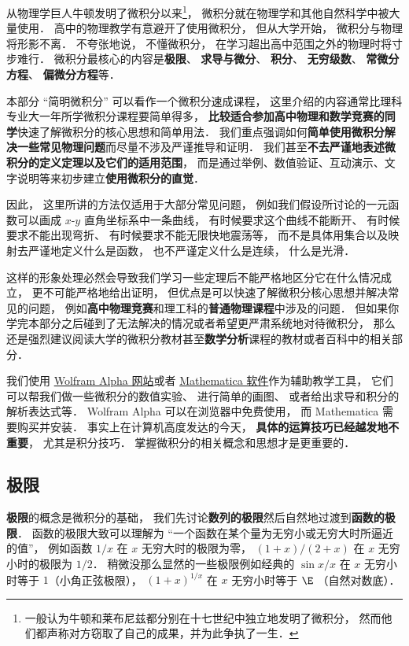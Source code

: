 
\begin{issues}
\issueDraft
\end{issues}

从物理学巨人牛顿发明了微积分以来\footnote{一般认为牛顿和莱布尼兹都分别在十七世纪中独立地发明了微积分， 然而他们都声称对方窃取了自己的成果，并为此争执了一生．}， 微积分就在物理学和其他自然科学中被大量使用． 高中的物理教学有意避开了使用微积分， 但从大学开始， 微积分与物理将形影不离． 不夸张地说， 不懂微积分， 在学习超出高中范围之外的物理时将寸步难行． 微积分最核心的内容是\textbf{极限}、 \textbf{求导与微分}、 \textbf{积分}、 \textbf{无穷级数}、 \textbf{常微分方程}、 \textbf{偏微分方程}等．

本部分 “简明微积分” 可以看作一个微积分速成课程， 这里介绍的内容通常比理科专业大一年所学微积分课程要简单得多， \textbf{比较适合参加高中物理和数学竞赛的同学}快速了解微积分的核心思想和简单用法． 我们重点强调如何\textbf{简单使用微积分解决一些常见物理问题}而尽量不涉及严谨推导和证明． 我们甚至\textbf{不去严谨地表述微积分的定义定理以及它们的适用范围}， 而是通过举例、数值验证、互动演示、文字说明等来初步建立\textbf{使用微积分的直觉}．

因此， 这里所讲的方法仅适用于大部分常见问题， 例如我们假设所讨论的一元函数可以画成 $x$-$y$ 直角坐标系中一条曲线， 有时候要求这个曲线不能断开、 有时候要求不能出现弯折、 有时候要求不能无限快地震荡等， 而不是具体用集合以及映射去严谨地定义什么是函数， 也不严谨定义什么是连续， 什么是光滑．

这样的形象处理必然会导致我们学习一些定理后不能严格地区分它在什么情况成立， 更不可能严格地给出证明， 但优点是可以快速了解微积分核心思想并解决常见的问题， 例如\textbf{高中物理竞赛}和理工科的\textbf{普通物理课程}中涉及的问题． 但如果你学完本部分之后碰到了无法解决的情况或者希望更严肃系统地对待微积分， 那么还是强烈建议阅读大学的微积分教材甚至\textbf{数学分析}课程的教材或者百科中的相关部分．

我们使用 \href{https://www.wolframalpha.com/}{Wolfram Alpha 网站}或者 \href{https://www.wolfram.com/mathematica/}{Mathematica 软件}作为辅助教学工具， 它们可以帮我们做一些微积分的数值实验、 进行简单的画图、 或者给出求导和积分的解析表达式等． Wolfram Alpha 可以在浏览器中免费使用， 而 Mathematica 需要购买并安装． 事实上在计算机高度发达的今天， \textbf{具体的运算技巧已经越发地不重要}， 尤其是积分技巧． 掌握微积分的相关概念和思想才是更重要的．

\subsection{极限}
\textbf{极限}的概念是微积分的基础， 我们先讨论\textbf{数列的极限}然后自然地过渡到\textbf{函数的极限}． 函数的极限大致可以理解为 “一个函数在某个量为无穷小或无穷大时所逼近的值”， 例如函数 $1/x$ 在 $x$ 无穷大时的极限为零， $(1+x)/(2+x)$ 在 $x$ 无穷小时的极限为 $1/2$． 稍微没那么显然的一些极限例如经典的 $\sin x/ x$ 在 $x$ 无穷小时等于 $1$（小角正弦极限）， $(1+x)^{1/x}$ 在 $x$ 无穷小时等于 $\E$ （自然对数底）．

